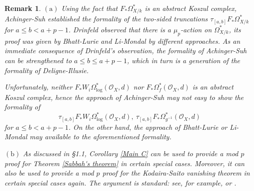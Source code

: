 \documentclass[12pt, a4paper]{article}
\newtheorem{theorem}{Theorem}[section]
\newtheorem{remark}{Remark}[section]
\begin{document}

\begin{remark}
$\mathrm{(a)}$ Using the fact that $F_*\Omega^*_{X/k}$ is an abstract Koszul complex, Achinger-Suh\cite{AS} established the formality of the two-sided truncations $\tau_{[a,b]}F_*\Omega^*_{X/k}$ for $a\leq b<a+p-1$. Drinfeld observed that there is a $\mu_p$-action on $\Omega^*_{X/k}$, its proof was given by Bhatt-Lurie\cite{BL} and Li-Mondal\cite{LM} by different approaches. As an immediate consequence of Drinfeld's observation, the formality of Achinger-Suh can be strengthened to $a\leq b\leq a+p-1$, which in turn is a generation of the formality of Deligne-Illusie\cite{DI}.

Unfortunately, neither $F_*W_i\Omega^*_{\log}(\mathcal O_X,d)$ nor $F_*\Omega^*_f(\mathcal O_X,d)$ is an abstract Koszul complex, hence the approach of Achinger-Suh may not easy to show the formality of
$$\tau_{[a,b]}F_*W_i\Omega^*_{\log}(\mathcal O_X,d),~\tau_{[a,b]}F_*\Omega^*_{g^{-1}}(\mathcal O_X,d)$$
for $a\leq b<a+p-1$. On the other hand, the approach of Bhatt-Lurie or Li-Mondal may available to the aforementioned formality. 

$\mathrm{(b)}$ As discussed in \S1.1, Corollary \ref{Main C} can be used to provide a mod $p$ proof for Theorem \ref{Sabbah's theorem} in certain special cases. Moreover, it can also be used to provide a mod $p$ proof for the Kodaira-Saito vanishing theorem in certain special cases again. The argument is standard: see, for example, \cite[\S4.7]{OV} or \cite[\S5]{SZ2}.

\end{remark}
\fi
\end{document}
